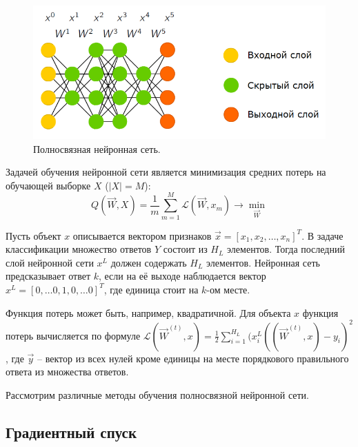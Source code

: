 \begin{figure}[h]
	\centering
	\includegraphics[width=0.6\linewidth]{chapters/neural/images/full_net.png}
	\caption{Полносвязная нейронная сеть.}
	\label{img:full_net}
\end{figure}

Задачей обучения нейронной сети является минимизация средних потерь на обучающей выборке $X$ ($|X| = M$):
$$
	Q(\overrightarrow{W}, X) = \frac{1}{m} \sum\limits_{m = 1}^{M} \mathcal{L} (\overrightarrow{W}, x_m) \rightarrow \min_{\overrightarrow{W}}
$$

Пусть объект $x$ описывается вектором признаков $\overrightarrow{x} = [x_1, x_2, \dots, x_n]^T$. В задаче классификации множество ответов $Y$ состоит из $H_L$ элементов. Тогда последний слой нейронной сети $x^{L}$ должен содержать $H_L$ элементов. Нейронная сеть предсказывает ответ $k$, если на её выходе наблюдается вектор $x^L = [0, \dots 0, 1, 0, \dots 0]^T$, где единица стоит на $k$-ом месте.

Функция потерь может быть, например, квадратичной. Для объекта $x$ функция потерь вычисляется по формуле $\mathcal{L} (\overrightarrow{W}^{(t)}, x) = \frac{1}{2} \sum\limits_{i = 1}^{H_L} (x^L_i ((\overrightarrow{W}^{(t)}, x) - y_i)^2$, где $\overrightarrow{y}$ -- вектор из всех нулей кроме единицы на месте порядкового правильного ответа из множества ответов.

Рассмотрим различные методы обучения полносвязной нейронной сети.

\subsection{Градиентный спуск}

